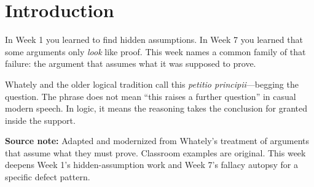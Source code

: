\documentclass[12pt]{article}
\newcommand{\focusbox}[1]{\par\vspace{0.4em}\noindent\begingroup\setlength{\fboxsep}{6pt}\colorbox{gray!12}{\begin{minipage}{\dimexpr\linewidth-2\fboxsep\relax}#1\end{minipage}}\endgroup\par\vspace{0.5em}}
\begin{document}
\section*{Introduction}
In Week 1 you learned to find hidden assumptions. In Week 7 you learned that some arguments only \textit{look} like proof. This week names a common family of that failure: the argument that assumes what it was supposed to prove.

Whately and the older logical tradition call this \textit{petitio principii}---begging the question. The phrase does not mean ``this raises a further question'' in casual modern speech. In logic, it means the reasoning takes the conclusion for granted inside the support.

\focusbox{\textbf{Source note:} Adapted and modernized from Whately's treatment of arguments that assume what they must prove. Classroom examples are original. This week deepens Week 1's hidden-assumption work and Week 7's fallacy autopsy for a specific defect pattern.}
\end{document}
